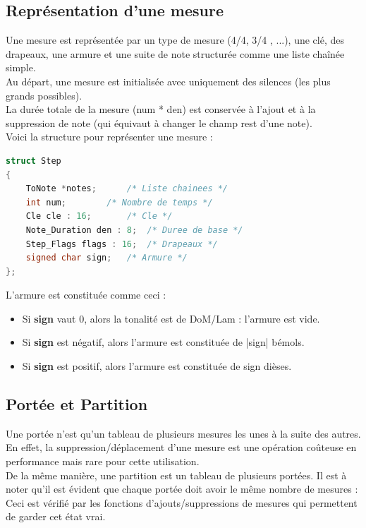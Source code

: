 \documentclass[12pt]{report}
\begin{document}
\subsection{Représentation d'une mesure}
Une mesure est représentée par un type de mesure (4/4, 3/4 , ...), une clé, des drapeaux, une armure et une suite de note structurée
comme une liste chaînée simple.\\Au départ, une mesure est initialisée avec uniquement des silences (les plus grands possibles).\\ La durée totale
de la mesure (num * den) est conservée à l'ajout et à la suppression de note (qui équivaut à changer le champ rest d'une note).\\ \newpage
Voici la structure pour représenter une mesure :\\
\lstset{style=CLangage}
\begin{lstlisting}[language=C]
struct Step
{
	ToNote *notes;		/* Liste chainees */
	int num;		/* Nombre de temps */
	Cle cle : 16;		/* Cle */
	Note_Duration den : 8;	/* Duree de base */
	Step_Flags flags : 16;	/* Drapeaux */
	signed char sign;	/* Armure */
};
\end{lstlisting}
\vskip 0.3in
L'armure est constituée comme ceci :\\
\begin{itemize}
 \item Si \textbf{sign} vaut 0, alors la tonalité est de DoM/Lam : l'armure est vide.\\
 \item Si \textbf{sign} est négatif, alors l'armure est constituée de |sign| bémols.\\
 \item Si \textbf{sign} est positif, alors l'armure est constituée de sign dièses.\\
\end{itemize}

\subsection{Portée et Partition}
Une portée n'est qu'un tableau de plusieurs mesures les unes à la suite des autres. En effet, la suppression/déplacement d'une mesure est une
opération coûteuse en performance mais rare pour cette utilisation.\\
De la même manière, une partition est un tableau de plusieurs portées. Il est à noter qu'il est évident que chaque portée doit avoir le même nombre
de mesures : Ceci est vérifié par les fonctions d'ajouts/suppressions de mesures qui permettent de garder cet état vrai.\\
\end{document}
